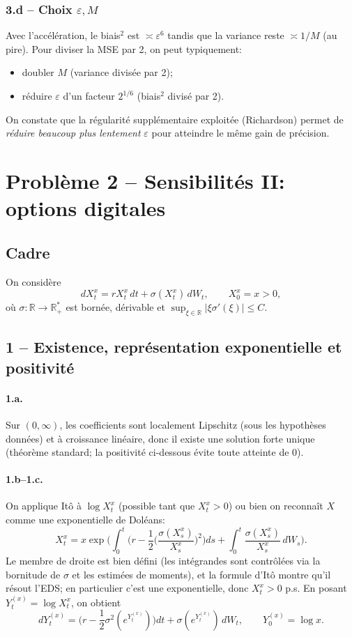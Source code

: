 \documentclass[11pt,a4paper]{article}
\newcommand{\R}{\mathbb{R}}
\newcommand{\1}{\mathbbm{1}}
\theoremstyle{plain}
\theoremstyle{definition}
\begin{document}
\subsubsection{3.d -- Choix $\varepsilon, M$}
Avec l'accélération, le biais$^2$ est $\asymp \varepsilon^6$ tandis que la variance reste $\asymp 1/M$ (au pire).
Pour diviser la MSE par 2, on peut typiquement:
\begin{itemize}[leftmargin=*]
  \item doubler $M$ (variance divisée par 2);
  \item réduire $\varepsilon$ d'un facteur $2^{1/6}$ (biais$^2$ divisé par 2).
\end{itemize}
On constate que la régularité supplémentaire exploitée (Richardson) permet de \emph{réduire beaucoup plus lentement} $\varepsilon$ pour atteindre le même gain de précision.

\section{Problème 2 -- Sensibilités II: options digitales}
\subsection{Cadre}
On considère
\[
dX_t^x=rX_t^x\,dt+\sigma(X_t^x)\,dW_t,\qquad X_0^x=x>0,
\]
où $\sigma:\R\to\R_+^*$ est bornée, dérivable et $\sup_{\xi\in\R}|\xi\sigma'(\xi)|\le C$.

\subsection{1 -- Existence, représentation exponentielle et positivité}
\paragraph{1.a.}
Sur $(0,\infty)$, les coefficients sont localement Lipschitz (sous les hypothèses données) et à croissance linéaire, donc il existe une solution forte unique (théorème standard; la positivité ci-dessous évite toute atteinte de $0$).
\paragraph{1.b--1.c.}
On applique Itô à $\log X_t^x$ (possible tant que $X_t^x>0$) ou bien on reconnaît $X$ comme une exponentielle de Doléans:
\[
X_t^x
=x\exp\Big(\int_0^t\Big(r-\frac12\Big(\frac{\sigma(X_s^x)}{X_s^x}\Big)^2\Big)ds+\int_0^t \frac{\sigma(X_s^x)}{X_s^x}\,dW_s\Big).
\]
Le membre de droite est bien défini (les intégrandes sont contrôlées via la bornitude de $\sigma$ et les estimées de moments), et la formule d'Itô montre qu'il résout l'EDS; en particulier c'est une exponentielle, donc $X_t^x>0$ p.s.
En posant $Y_t^{(x)}=\log X_t^x$, on obtient
\[
dY_t^{(x)}=\Big(r-\frac12\sigma^2(e^{Y_t^{(x)}})\Big)dt+\sigma(e^{Y_t^{(x)}})\,dW_t,\qquad Y_0^{(x)}=\log x.
\]
\end{document}

